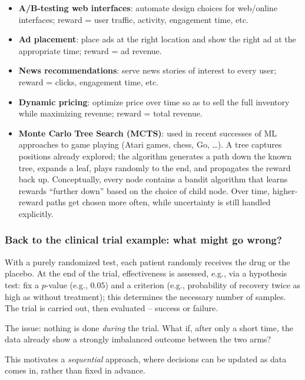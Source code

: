 \begin{itemize}
    \item \textbf{A/B-testing web interfaces}: automate design choices for web/online interfaces; reward = user traffic, activity, engagement time, etc.
    \item \textbf{Ad placement}: place ads at the right location and show the right ad at the appropriate time; reward = ad revenue.
    \item \textbf{News recommendations}: serve news stories of interest to every user; reward = clicks, engagement time, etc.
    \item \textbf{Dynamic pricing}: optimize price over time so as to sell the full inventory while maximizing revenue; reward = total revenue.
    \item \textbf{Monte Carlo Tree Search (MCTS)}: used in recent successes of ML approaches to game playing (Atari games, chess, Go, \dots). A tree captures positions already explored; the algorithm generates a path down the known tree, expands a leaf, plays randomly to the end, and propagates the reward back up. Conceptually, every node contains a bandit algorithm that learns rewards ``further down'' based on the choice of child node. Over time, higher-reward paths get chosen more often, while uncertainty is still handled explicitly.
\end{itemize}

\subsubsection*{Back to the clinical trial example: what might go wrong?}

With a purely randomized test, each patient randomly receives the drug or the placebo. At the end of the trial, effectiveness is assessed, e.g., via a hypothesis test: fix a $p$-value (e.g., $0.05$) and a criterion (e.g., probability of recovery twice as high as without treatment); this determines the necessary number of samples. The trial is carried out, then evaluated -- success or failure.

The issue: nothing is done \emph{during} the trial. What if, after only a short time, the data already show a strongly imbalanced outcome between the two arms?

This motivates a \emph{sequential} approach, where decisions can be updated as data comes in, rather than fixed in advance.

